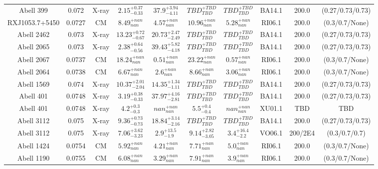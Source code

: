 \begin{table}
\begin{tabular}{cccccccccc}
Abell 399 & 0.072 & X-ray & ${2.15}^{+0.37}_{-0.33}$ & ${37.9}^{+3.94}_{-4.11}$ & ${TBD}^{+TBD}_{TBD}$ & ${TBD}^{+TBD}_{TBD}$ & BA14.1 & 200.0 & (0.27/0.73/0.73) \\
RXJ1053.7+5450 & 0.0727 & CM & ${8.49}^{+nan}_{nan}$ & ${4.57}^{+nan}_{nan}$ & ${10.96}^{+nan}_{nan}$ & ${5.28}^{+nan}_{nan}$ & RI06.1 & 200.0 & (0.3/0.7/None) \\
Abell 2462 & 0.073 & X-ray & ${13.23}^{+0.72}_{-0.67}$ & ${20.73}^{+2.47}_{-2.49}$ & ${TBD}^{+TBD}_{TBD}$ & ${TBD}^{+TBD}_{TBD}$ & BA14.1 & 200.0 & (0.27/0.73/0.73) \\
Abell 2065 & 0.073 & X-ray & ${2.38}^{+0.64}_{-0.56}$ & ${39.43}^{+5.82}_{-4.18}$ & ${TBD}^{+TBD}_{TBD}$ & ${TBD}^{+TBD}_{TBD}$ & BA14.1 & 200.0 & (0.27/0.73/0.73) \\
Abell 2067 & 0.0737 & CM & ${18.24}^{+nan}_{nan}$ & ${0.51}^{+nan}_{nan}$ & ${23.22}^{+nan}_{nan}$ & ${0.57}^{+nan}_{nan}$ & RI06.1 & 200.0 & (0.3/0.7/None) \\
Abell 2064 & 0.0738 & CM & ${6.67}^{+nan}_{nan}$ & ${2.6}^{+nan}_{nan}$ & ${8.66}^{+nan}_{nan}$ & ${3.06}^{+nan}_{nan}$ & RI06.1 & 200.0 & (0.3/0.7/None) \\
Abell 1569 & 0.074 & X-ray & ${10.37}^{+2.01}_{-2.04}$ & ${14.35}^{+1.34}_{-1.11}$ & ${TBD}^{+TBD}_{TBD}$ & ${TBD}^{+TBD}_{TBD}$ & BA14.1 & 200.0 & (0.27/0.73/0.73) \\
Abell 401 & 0.0748 & X-ray & ${3.19}^{+0.38}_{-0.33}$ & ${37.97}^{+4.16}_{-2.81}$ & ${TBD}^{+TBD}_{TBD}$ & ${TBD}^{+TBD}_{TBD}$ & BA14.1 & 200.0 & (0.27/0.73/0.73) \\
Abell 401 & 0.0748 & X-ray & ${4.2}^{+0.3}_{-0.3}$ & ${nan}^{+nan}_{nan}$ & ${5.5}^{+0.4}_{-0.4}$ & ${nan}^{+nan}_{nan}$ & XU01.1 & TBD & TBD \\
Abell 3112 & 0.075 & X-ray & ${9.36}^{+0.73}_{-0.73}$ & ${18.84}^{+3.14}_{-2.16}$ & ${TBD}^{+TBD}_{TBD}$ & ${TBD}^{+TBD}_{TBD}$ & BA14.1 & 200.0 & (0.27/0.73/0.73) \\
Abell 3112 & 0.075 & X-ray & ${7.06}^{+3.62}_{-3.23}$ & ${2.9}^{+13.5}_{-1.9}$ & ${9.14}^{+2.82}_{-3.05}$ & ${3.4}^{+16.4}_{-2.2}$ & VO06.1 & 200/2E4 & (0.3/0.7/0.7) \\
Abell 1424 & 0.0754 & CM & ${5.92}^{+nan}_{nan}$ & ${4.21}^{+nan}_{nan}$ & ${7.71}^{+nan}_{nan}$ & ${5.0}^{+nan}_{nan}$ & RI06.1 & 200.0 & (0.3/0.7/None) \\
Abell 1190 & 0.0755 & CM & ${6.08}^{+nan}_{nan}$ & ${3.29}^{+nan}_{nan}$ & ${7.91}^{+nan}_{nan}$ & ${3.9}^{+nan}_{nan}$ & RI06.1 & 200.0 & (0.3/0.7/None) \\

\end{tabular}
\end{table}
